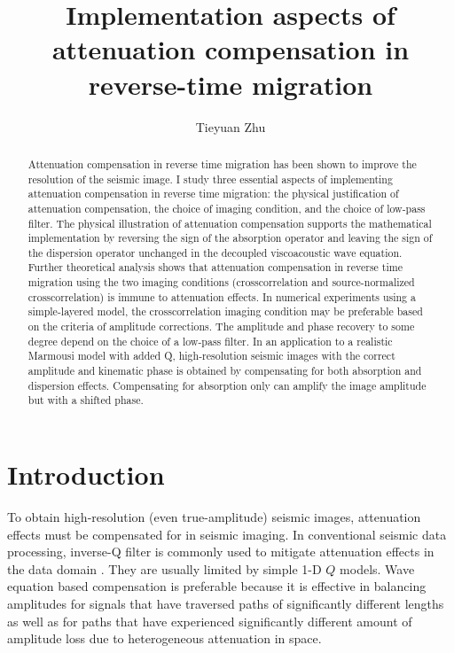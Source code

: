 \author{Tieyuan Zhu}
\title{Implementation aspects of attenuation compensation in reverse-time migration}


\begin{abstract}
Attenuation compensation in reverse time migration has been shown to improve the resolution of the seismic image. I study three essential aspects of implementing attenuation compensation in reverse time migration: the physical justification of attenuation compensation, the choice of imaging condition, and the choice of low-pass filter. The physical illustration of attenuation compensation supports the mathematical implementation by reversing the sign of the absorption operator and leaving the sign of the dispersion operator unchanged in the decoupled viscoacoustic wave equation. Further theoretical analysis shows that attenuation compensation in reverse time migration using the two imaging conditions (crosscorrelation and source-normalized crosscorrelation) is immune to attenuation effects. In numerical experiments using a simple-layered model, the crosscorrelation imaging condition may be preferable based on the criteria of amplitude corrections. The amplitude and phase recovery to some degree depend on the choice of a low-pass filter. In an application to a realistic Marmousi model with added Q, high-resolution seismic images with the correct amplitude and kinematic phase is obtained by compensating for both absorption and dispersion effects. Compensating for absorption only can amplify the image amplitude but with a shifted phase.
\end{abstract}

\section{Introduction}
To obtain high-resolution (even true-amplitude) seismic images, attenuation effects must be compensated for in seismic imaging. In conventional seismic data processing, inverse-Q filter is commonly used to mitigate attenuation effects in the data domain \citet[]{wang2002}. They are usually limited by simple 1-D $Q$ models. Wave equation based compensation is preferable because it is effective in balancing amplitudes for signals that have traversed paths of significantly different lengths as well as for paths that have experienced significantly different amount of amplitude loss due to heterogeneous attenuation in space.

